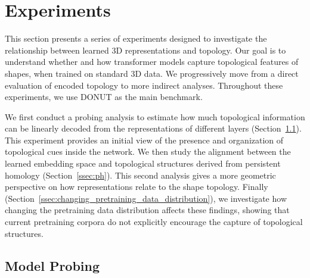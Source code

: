 \section{Experiments}
\label{sec:experiments}

This section presents a series of experiments designed to investigate the relationship between learned 3D representations and topology. Our goal is to understand whether and how transformer models capture topological features of shapes, when trained on standard 3D data. We progressively move from a direct evaluation of encoded topology to more indirect analyses. Throughout these experiments, we use DONUT as the main benchmark.

We first conduct a probing analysis to estimate how much topological information can be linearly decoded from the representations of different layers (Section~\ref{ssec:model_probing}). This experiment provides an initial view of the presence and organization of topological cues inside the network. We then study the alignment between the learned embedding space and topological structures derived from persistent homology (Section~\ref{ssec:ph}). This second analysis gives a more geometric perspective on how representations relate to the shape topology. Finally (Section~\ref{ssec:changing_pretraining_data_distribution}), we investigate how changing the pretraining data distribution affects these findings, showing that current pretraining corpora do not explicitly encourage the capture of topological structures.

\subsection{Model Probing}
\label{ssec:model_probing}

